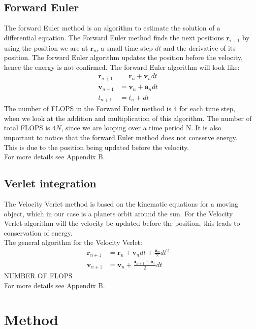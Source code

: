 \documentclass{article}
\begin{document}
\begin{multicols}{2}
\subsection{Forward Euler}
The forward Euler method is an algorithm to estimate the solution of a differential equation. The Forward Euler method  finds the next positions $\mathbf{r}_{i+1}$ by using the position we are at $\mathbf{r}_{n}$, a small time step $dt$ and the derivative of its position. The forward Euler algorithm updates the position before the velocity, hence the energy is not confirmed. 
The forward Euler algorithm will look like:
\begin{align*}
    \mathbf{r}_{n+1}&=\mathbf{r}_n+\mathbf{v}_ndt\\
    \mathbf{v}_{n+1}&=\mathbf{v}_n+\mathbf{a}_ndt\\
    t_{n+1}&=t_n + dt
\end{align*}
The number of FLOPS in the Forward Euler method is 4 for each time step, when we look at the addition and multiplication of this algorithm. The number of total FLOPS is $4N$, since we are looping over a time period N. It is also important to notice that the forward Euler method does not conserve energy. This is due to the position being updated before the velocity.  \\
For more details see Appendix B.
\\
\subsection{Verlet integration}
The Velocity Verlet method is based on the kinematic equations for a moving object, which in our case is a planets orbit around the sun. For the Velocity Verlet algorithm will the velocity be updated before the position, this leads to conservation of energy.\\   
The general algorithm for the Velocity Verlet:
\begin{align*}
    \mathbf{r}_{n+1}&=\mathbf{r}_n+\mathbf{v}_ndt+\frac{\mathbf{a}_n}{2}dt^2\\
    \mathbf{v}_{n+1}&=\mathbf{v}_n+\frac{\mathbf{a}_{n+1}-\mathbf{a}_n}{2}dt
\end{align*}
NUMBER OF FLOPS\\
For more details see Appendix B.

\section{Method}


\end{multicols}
\end{document}
